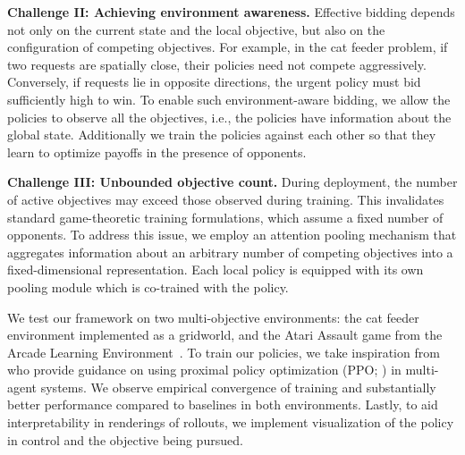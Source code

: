\textbf{Challenge II: Achieving environment awareness.}
Effective bidding depends not only on the current state and the local objective, but also on the configuration of competing objectives. 
For example, in the cat feeder problem, if two requests are spatially close, their policies need not compete aggressively. 
Conversely, if requests lie in opposite directions, the urgent policy must bid sufficiently high to win. 
To enable such environment-aware bidding, we allow the policies to observe all the objectives, i.e., the policies have information about the global state. 
Additionally we train the policies against each other so that they learn to optimize payoffs in the presence of opponents.

\textbf{Challenge III: Unbounded objective count.}
During deployment, the number of active objectives may exceed those observed during training. 
This invalidates standard game-theoretic training formulations, which assume a fixed number of opponents. 
To address this issue, we employ an attention pooling mechanism that aggregates information about an arbitrary number of competing objectives into a fixed-dimensional representation. 
Each local policy is equipped with its own pooling module which is co-trained with the policy. 

We test our framework on two multi-objective environments: the cat feeder environment implemented as a gridworld, and the Atari Assault game from the Arcade Learning Environment~\citep{bellemare13arcade}.
To train our policies, we take inspiration from \citet{yu2022mappo} who provide guidance on using proximal policy optimization (PPO; \citet{schulman2017ppo}) in multi-agent systems.
We observe empirical convergence of training and substantially better performance compared to baselines in both environments.
Lastly, to aid interpretability in renderings of rollouts, we implement visualization of the policy in control and the objective being pursued.
